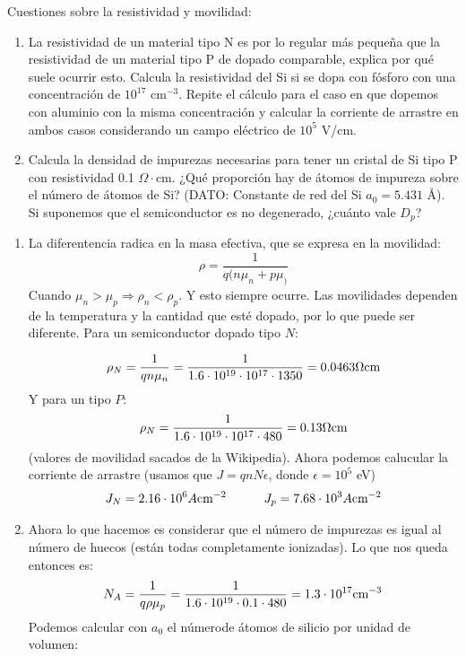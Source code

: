 \begin{texercise}
	Cuestiones sobre la resistividad y movilidad:
	\begin{enumerate}[label=\alph*)]
		\item La resistividad de un material tipo N es por lo regular más pequeña que la resistividad de un material tipo P de dopado comparable, explica por qué suele ocurrir esto. Calcula la resistividad del Si si se dopa con fósforo con una concentración de \( 10^{17} \) cm\(^{-3}\). Repite el cálculo para el caso en que dopemos con aluminio con la misma concentración y calcular la corriente de arrastre en ambos casos considerando un campo eléctrico de \( 10^5 \) V/cm.

		\item Calcula la densidad de impurezas necesarias para tener un cristal de Si tipo P con resistividad 0.1 \(\Omega\cdot\)cm. ¿Qué proporción hay de átomos de impureza sobre el número de átomos de Si?
		      (DATO: Constante de red del Si \( a_0 = 5.431 \) Å). Si suponemos que el semiconductor es no degenerado, ¿cuánto vale \( D_p \)?
	\end{enumerate}
	\tcblower
	\begin{enumerate}[label=\alph*)]
		\item La diferentencia radica en la masa efectiva, que se expresa en la movilidad:
		      \begin{equation}
			      \rho = \frac{1}{q(n\mu_n + p \mu_)}
		      \end{equation}
		      Cuando $\mu_n>\mu_p \Rightarrow \rho_n < \rho_p$. Y esto siempre ocurre. Las movilidades dependen de la temperatura y la cantidad que esté dopado, por lo que puede ser diferente. Para un semiconductor dopado tipo $N$:

		      \begin{equation}
			      \rho_N = \frac{1}{qn{\mu_n}} = \frac{1}{1.6\cdot 10^{19} \cdot 10^{17}\cdot 1350}= 0.0463 \Omega \text{cm}
		      \end{equation}
		      Y para un tipo $P$:
		      \begin{equation}
			      \rho_N = \frac{1}{1.6\cdot 10^{19} \cdot 10^{17}\cdot 480} = 0.13 \Omega \text{cm}
		      \end{equation}
		      (valores de movilidad sacados de la Wikipedia). Ahora podemos calucular la corriente de arrastre (usamos que $J=qnN\epsilon$, donde $\epsilon = 10^5$ eV)
		      \begin{equation}
			      J_N =  2.16 \cdot 10^6  A\text{cm}^{-2}  \quad \quad \quad J_p = 7.68 \cdot 10^3  A\text{cm}^{-2}
		      \end{equation}
		\item Ahora lo que hacemos es considerar que el número de impurezas es igual al número de huecos (están todas completamente ionizadas). Lo que nos queda entonces es:
		      \begin{equation}
			      N_A = \frac{1}{q\rho \mu_p } = \frac{1}{1.6\cdot 10^{19} \cdot 0.1 \cdot 480} = 1.3 \cdot 10^{17} \text{cm}^{-3}
		      \end{equation}
		      Podemos calcular con $a_0$ el númerode átomos de silicio por unidad de volumen:


\end{enumerate}
\end{texercise}
